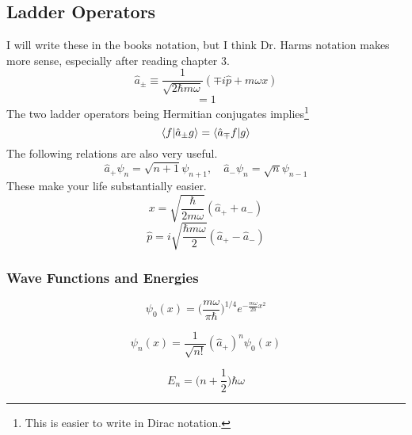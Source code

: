 \subsection{Ladder Operators}
I will write these in the books notation, but I think Dr. Harms notation makes more sense, especially after reading chapter 3.
\begin{equation}\label{eq:ladderoperators}
    \hat{a}_\pm \equiv \frac{1}{\sqrt{2\hbar m \omega}}(\mp i \hat{p} + m\omega x)
\end{equation}
\begin{equation*}
    [\hat{a}_-, \hat{a}_+]=1
\end{equation*}
The two ladder operators being Hermitian conjugates implies\footnote{This is easier to write in Dirac notation.}
\begin{equation*}
    \langle f|\hat{a}_\pm g \rangle = \langle \hat{a}_\mp f|g \rangle
\end{equation*}
The following relations are also very useful.
\begin{equation}\label{eq:ladderonpsi_n}
    \hat{a}_+\psi_n = \sqrt{n+1}\psi_{n+1}, \quad \hat{a}_-\psi_n = \sqrt{n}\psi_{n-1}
\end{equation}
These make your life substantially easier.
\begin{equation}\label{eq:ladders-x}
    x = \sqrt{\frac{\hbar}{2m\omega}}(\hat{a}_+ + \hat{a}_-)
\end{equation}
\begin{equation}\label{eq:ladders-p}
    \hat{p} = i\sqrt{\frac{\hbar m \omega}{2}}(\hat{a}_+ - \hat{a}_-)
\end{equation}

\subsubsection{Wave Functions and Energies}
\begin{equation}\label{eq:HO-groundstate}
    \psi_0(x) = \Big(\frac{m\omega}{\pi\hbar}\Big)^{1/4} e^{-\frac{m\omega}{2\hbar}x^2}
\end{equation}

\begin{equation}\label{eq:HO-ladderedstates}
    \psi_n(x) = \frac{1}{\sqrt{n!}} (\hat{a}_+)^n \psi_0(x)
\end{equation}

\begin{equation}\label{HO-energies}
    E_n = \Big(n+\frac{1}{2}\Big)\hbar \omega
\end{equation}



